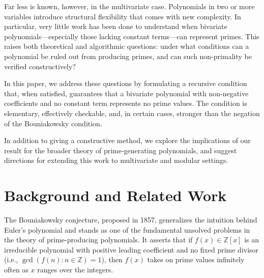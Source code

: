 \documentclass[a4paper,11pt]{article}
\begin{document}
	Far less is known, however, in the multivariate case. Polynomials in two or more variables introduce structural flexibility that comes with new complexity. In particular, very little work has been done to understand when bivariate polynomials—especially those lacking constant terms—can represent primes. This raises both theoretical and algorithmic questions: under what conditions can a polynomial be ruled out from producing primes, and can such non-primality be verified constructively?
	
	In this paper, we address these questions by formulating a recursive condition that, when satisfied, guarantees that a bivariate polynomial with non-negative coefficients and no constant term represents no prime values. The condition is elementary, effectively checkable, and, in certain cases, stronger than the negation of the Bouniakowsky condition. %
	
	In addition to giving a constructive method, we explore the implications of our result for the broader theory of prime-generating polynomials, and suggest directions for extending this work to multivariate and modular settings.
	
	
	\section{Background and Related Work}
	
	The Bouniakowsky conjecture, proposed in 1857, generalizes the intuition behind Euler's polynomial and stands as one of the fundamental unsolved problems in the theory of prime-producing polynomials. It asserts that if $f(x) \in \mathbb{Z}[x]$ is an irreducible polynomial with positive leading coefficient and no fixed prime divisor (i.e., $\gcd(f(n) : n \in \mathbb{Z}) = 1$), then $f(x)$ takes on prime values infinitely often as $x$ ranges over the integers.
	
\end{document}
